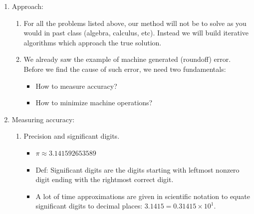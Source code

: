 \documentclass{article}
\theoremstyle{remark}
\begin{document}
\begin{enumerate}
\item Approach: 
\begin{enumerate}
\item For all the problems listed above, our method will not be to solve as you would in past class (algebra, calculus, etc). Instead we will build iterative algorithms which approach the true solution.

\item We already saw the example of machine generated (roundoff) error. Before we find the cause of such error, we need two fundamentals:
\begin{itemize}
\item How to measure accuracy?
\item How to minimize machine operations?
\end{itemize}
\end{enumerate}


\item Measuring accuracy:
\begin{enumerate}
\item Precision and significant digits.
\begin{itemize}
\item $\pi \approx 3.141592653589$
\item Def: Significant digits are the digits starting with leftmost nonzero digit ending with the rightmost correct digit.
\item A lot of time approximations are given in scientific notation to equate significant digits to decimal places: $3.1415 = 0.31415 \times 10^1$. 
\end{itemize}


\end{enumerate}
\end{enumerate}
\end{document}
